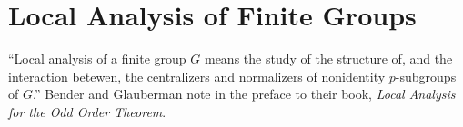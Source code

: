 \section{Local Analysis of Finite Groups}

``Local analysis of a finite group $G$ means the study of the structure
of, and the interaction betewen, the centralizers and normalizers of
nonidentity $p$-subgroups of $G$.'' Bender and Glauberman note in the
preface to their book, \emph{Local Analysis for the Odd Order Theorem}.
